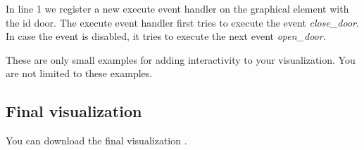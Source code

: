 In line 1 we register a new execute event handler on the graphical element with the id door.
The execute event handler first tries to execute the event \textit{close\_door}.
In case the event is disabled, it tries to execute the next event \textit{open\_door}.

These are only small examples for adding interactivity to your visualization.
You are not limited to these examples.

\subsection{Final visualization}

You can download the final visualization .
